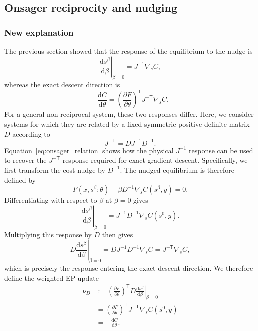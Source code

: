 \documentclass{article}
\begin{document}
\subsection{Onsager reciprocity and nudging}
\label{sec:two_sections_symmetrizable_fields}
\subsubsection{New explanation}
The previous section showed that the response of the equilibrium to the nudge is
\begin{equation}
\left.\frac{\mathrm ds^\beta}{\mathrm d\beta}\right|_{\beta=0}
=
J^{-1}\nabla_s C,
\end{equation}
whereas the exact descent direction is
\begin{equation}
-\frac{\mathrm d C}{\mathrm d\theta}
=
\left(\frac{\partial F}{\partial\theta}\right)^{\mathsf T}
J^{-\mathsf T}\nabla_s C.
\end{equation}
For a general non-reciprocal system, these two responses differ.
Here, we consider systems for which they are related by a fixed
symmetric positive-definite matrix $D$ according to
\begin{equation}
J^{-\mathsf T}=D J^{-1}D^{-1}.
\label{eq:onsager_relation}
\end{equation}
Equation~\eqref{eq:onsager_relation} shows how the physical
$J^{-1}$ response can be used to recover the $J^{-\mathsf T}$
response required for exact gradient descent. Specifically, we first
transform the cost nudge by $D^{-1}$. The nudged equilibrium is therefore
defined by
\begin{equation}
F(x,s^\beta;\theta)
-\beta D^{-1}\nabla_s C(s^\beta,y)=0.
\label{eq:two_sections_weighted_nudging}
\end{equation}
Differentiating with respect to $\beta$ at $\beta=0$ gives
\begin{equation}
\left.\frac{\mathrm ds^\beta}{\mathrm d\beta}\right|_{\beta=0}
=
J^{-1}D^{-1}\nabla_s C(s^0,y).
\label{eq:two_sections_weighted_response}
\end{equation}
Multiplying this response by $D$ then gives
\begin{equation}
D
\left.\frac{\mathrm ds^\beta}{\mathrm d\beta}\right|_{\beta=0}
=
D J^{-1}D^{-1}\nabla_s C
=
J^{-\mathsf T}\nabla_s C,
\end{equation}
which is precisely the response entering the exact descent direction.
We therefore define the weighted EP update
\begin{equation}
\begin{aligned}
\nu_D
&:=
\left(\frac{\partial F}{\partial\theta}\right)^{\mathsf T}D
\left.\frac{\mathrm ds^\beta}{\mathrm d\beta}\right|_{\beta=0}
\\
&=
\left(\frac{\partial F}{\partial\theta}\right)^{\mathsf T}
J^{-\mathsf T}\nabla_s C(s^0,y)
\\
&=
-\frac{\mathrm dC}{\mathrm d\theta}.
\end{aligned}
\label{eq:weighted_vector_field_update}
\end{equation}
\end{document}
